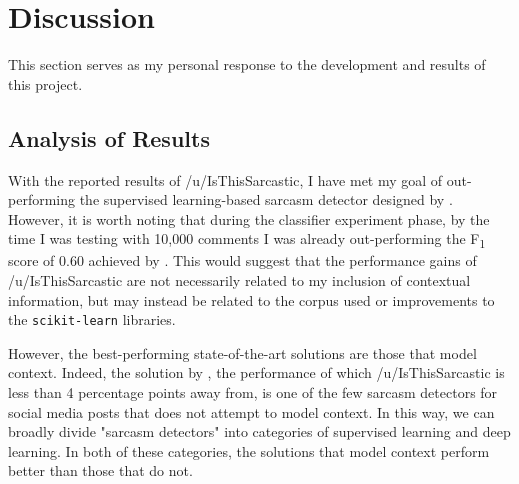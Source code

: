 \documentclass[a4paper,12pt]{article}
\begin{document}
\section{Discussion}
This section serves as my personal response to the development and results of this project.

\subsection{Analysis of Results}
With the reported results of /u/IsThisSarcastic, I have met my goal of out-performing the supervised learning-based sarcasm detector designed by \cite{clicheSarcasmDetector2014}. However, it is worth noting that during the classifier experiment phase, by the time I was testing with 10,000 comments I was already out-performing the F\textsubscript{1} score of 0.60 achieved by \cite{clicheSarcasmDetector2014}. This would suggest that the performance gains of /u/IsThisSarcastic are not necessarily related to my inclusion of contextual information, but may instead be related to the corpus used or improvements to the \texttt{scikit-learn} libraries.

However, the best-performing state-of-the-art solutions are those that model context. Indeed, the solution by \cite{tayReasoningSarcasmReading2018}, the performance of which /u/IsThisSarcastic is less than 4 percentage points away from, is one of the few sarcasm detectors for social media posts that does not attempt to model context. In this way, we can broadly divide "sarcasm detectors" into categories of supervised learning and deep learning. In both of these categories, the solutions that model context perform better than those that do not.
\end{document}
